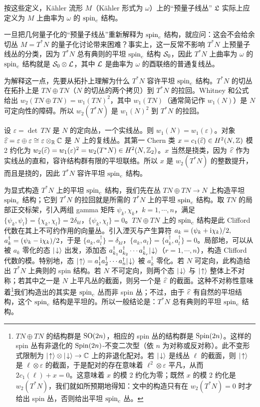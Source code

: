 按这些定义，Kähler 流形 $M$（Kähler 形式为 $\omega$）上的“预量子线丛” ${\mathfrak L}$ 实际上应定义为 $M$ 上曲率为 $\omega$ 的 ${\mathrm{spin}_c}$ 结构。

一旦把几何量子化的“预量子线丛”重新解释为 ${\mathrm{spin}_c}$ 结构，就应问：这会不会给余切丛 $M=T^*N$ 的量子化讨论带来困难？事实上，这一反常不影响 $T^*N$ 上预量子线丛的分类，因为 $T^*N$ 总有典则的平坦 ${\mathrm{spin}_c}$ 结构 ${\mathcal S}_0$，因此 $T^*N$ 上曲率为 $\omega$ 的 ${\mathrm{spin}_c}$ 结构就是 ${\mathcal S}_0\otimes {\mathcal L}$，其中 ${\mathcal L}$ 是曲率为 $\omega$ 的酉联络的普通复线丛。

为解释这一点，先要从拓扑上理解为什么 $T^*N$ 容许平坦 ${\mathrm{spin}_c}$ 结构。$T^*N$ 的切丛在拓扑上是 $TN\oplus TN$（$N$ 的切丛的两个拷贝）到 $T^*N$ 的拉回。Whitney 和公式给出 $w_2(TN\oplus TN)= w_1(TN)^2$，其中 $w_1(TN)$（通常简记作 $w_1(N)$）是 $N$ 可定向性的障碍。所以 $w_2(T^*N)$ 是 $w_1(N)^2$ 到 $T^*N$ 的拉回。

设 $\varepsilon=\det \,TN$ 是 $N$ 的定向丛，一个实线丛。则 $w_1(N)=w_1(\varepsilon)$。对象 $\widehat\varepsilon=\varepsilon\oplus \varepsilon\cong \varepsilon\otimes_{\mathbb R}{\mathbb C}$ 是 $N$ 上的复线丛。其第一 Chern 类 $x=c_1(\widehat\varepsilon)\in H^2(N,{\mathbb Z})$ 模 2 约化为 $w_2(\widehat\varepsilon)=w_1(\varepsilon)^2=w_2(T^*N)\in H^2(N,{\mathbb Z}_2)$。$x$ 当然是挠类，因为 $\widehat\varepsilon$ 作为实线丛的直和，容许结构群有限的平坦联络。所以 $x$ 是 $w_2(T^*N)$ 的整数提升，而且是挠的，因此 $T^*N$ 容许平坦 ${\mathrm{spin}_c}$ 结构。

为显式构造 $T^*N$ 上的平坦 ${\mathrm{spin}_c}$ 结构，我们先在丛 $TN\oplus TN\to N$ 上构造平坦 ${\mathrm{spin}_c}$ 结构；它到 $T^*N$ 的拉回就是所需的 $T^*N$ 上的平坦 ${\mathrm{spin}_c}$ 结构。取 $TN$ 的局部正交标架，引入两组 gamma 矩阵 $\psi_k, \chi_k$，$k=1,\cdots,n$，满足 $\{\psi_k,\psi_l\}=\{\chi_k,\chi_l\}=2\delta_{kl}$，$\{\psi_k,\chi_l\}=0$。$TN\oplus TN$ 上的 ${\mathrm{spin}_c}$ 结构是此 Clifford 代数在其上不可约作用的向量丛。引入湮灭与产生算符 $a_k=(\psi_k+{\mathrm i} \chi_k)/2,$ $a^\dagger_k=(\psi_k-{\mathrm i}\chi_k)/2$，于是 $\{a_k,a^\dagger_l\}=\delta_{kl}$，$\{a_k,a_l\}=\{a^\dagger_k,a^\dagger_l\}=0$。局部地，可以从被 $a_k$ 零化的态 $|\negthinspace\downarrow\rangle$ 出发，添加态 $a^\dagger_{k_1}a^\dagger_{k_2}\cdots a^\dagger_{k_r}|\negthinspace\downarrow\rangle$（$r=1,\cdots, n$），构造 Clifford 代数的模。特别地，态 $|\negthinspace\uparrow\rangle=a_1^\dagger a_2^\dagger\cdots a_n^\dagger|\negthinspace\downarrow\rangle$ 被 $a^\dagger_k$ 零化。若 $N$ 可定向，此构造给出 $T^*N$ 上典则的 spin 结构。若 $N$ 不可定向，则两个态 $|\negthinspace\downarrow\rangle$ 与 $|\negthinspace\uparrow\rangle$ 整体上不对称；若其中之一是 $N$ 上平凡丛的截面，则另一个是 $\widehat\varepsilon$ 的截面。这种不对称性意味着\footnote{$TN\oplus TN$ 的结构群是 ${\mathrm{SO}}(2n)$，相应的 spin 丛的结构群是 ${\mathrm{Spin}}(2n)$。这样的 spin 丛有非退化的 ${\mathrm{Spin}}(2n)$-不变二次型（依 $n$ 为对称或反对称）。此不变形式限制为 $|\negthinspace\uparrow\rangle \otimes |\negthinspace\downarrow\rangle\to {\mathbb C}$ 上的非退化配对。若 $|\negthinspace\downarrow\rangle$ 是线丛 $\ell$ 的截面，则 $|\negthinspace\uparrow\rangle$ 是 $\ell\otimes \varepsilon$ 的截面，于是配对的存在意味着 $\ell^2\otimes \varepsilon$ 平凡，从而 $2 c_1(\ell)+x=0$。这意味着 $x$ 的模 2 约化为零；既然 $x$ 的模 2 约化是 $w_2(T^*N)$，我们就如所预期地得知：文中的构造只有在 $w_2(T^*N)=0$ 时才给出 spin 丛，否则给出平坦 ${\mathrm{spin}_c}$ 丛。}我们构造出的其实是 ${\mathrm{spin}_c}$ 丛而非 spin 丛；不过，由于 $\widehat\varepsilon$ 有自然的平坦结构，这个 ${\mathrm{spin}_c}$ 结构是平坦的。所以一般结论是：$T^*N$ 总有典则的平坦 ${\mathrm{spin}_c}$ 结构。

